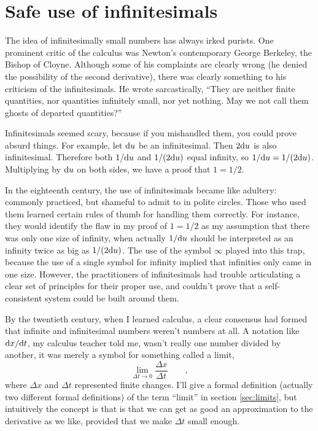 %

\section{Safe use of infinitesimals}\label{sec:safe-infinitesimals}

The idea of infinitesimally small numbers has always irked purists. One prominent critic of the calculus was Newton's
contemporary George Berkeley, the Bishop of Cloyne. Although some of his complaints are clearly wrong (he denied the
possibility of the second derivative), there was clearly something to his criticism of the infinitesimals. He wrote
sarcastically,
``They are neither finite quantities, nor quantities infinitely small, nor yet nothing. May we not call them ghosts of departed quantities?''

%
%
Infinitesimals seemed scary, because if you mishandled them, you could prove absurd things. For example, let $\textup{d} u$ be
an infinitesimal. Then $2\textup{d} u$ is also infinitesimal. Therefore both $1/\textup{d} u$ and $1/(2\textup{d} u)$ equal infinity, so
$1/\textup{d} u = 1/(2\textup{d} u)$. Multiplying by $\textup{d} u$ on both sides, we have a proof that $1=1/2$.\label{bogus-proof}

In the eighteenth century, the use of infinitesimals became like adultery: commonly practiced, but shameful to admit
to in polite circles. Those who used them learned certain rules of thumb for handling them correctly. For instance,
they would identify the flaw in my proof of $1=1/2$ as my assumption that there was only one size of infinity,
when actually $1/\textup{d} u$ should be interpreted as an infinity twice as big as $1/(2\textup{d} u)$. The use of the symbol
$\infty$ played into this trap, because the use of a single symbol for infinity implied that infinities only came
in one size. However, the practitioners of infinitesimals had trouble articulating a clear set of principles
for their proper use, and couldn't prove that a self-consistent system could be built around them.

By the twentieth century, when I learned calculus, a clear consensus had formed that infinite and infinitesimal
numbers weren't numbers at all. A notation like $\textup{d} x/\textup{d} t$, my calculus teacher told me, wasn't really
one number divided by another, it was merely a symbol for something called a limit,
\begin{equation*}
\lim_{\Delta t\rightarrow 0} \frac{\Delta x}{\Delta t} \qquad ,
\end{equation*}
where $\Delta x$ and $\Delta t$ represented finite changes. I'll give a formal definition (actually two different formal
definitions) of the term ``limit'' in section \ref{sec:limits}, but intuitively the concept is that is that we can get as good
an approximation to the derivative as we like, provided that we make $\Delta t$ small enough.

